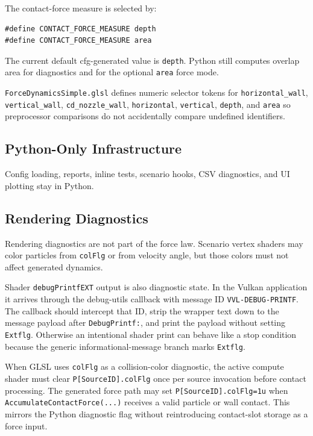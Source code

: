 The contact-force measure is selected by:
\begin{verbatim}
#define CONTACT_FORCE_MEASURE depth
#define CONTACT_FORCE_MEASURE area
\end{verbatim}
The current default cfg-generated value is \texttt{depth}.  Python still
computes overlap area for diagnostics and for the optional \texttt{area}
force mode.

\texttt{ForceDynamicsSimple.glsl} defines numeric selector tokens for
\texttt{horizontal\_wall}, \texttt{vertical\_wall},
\texttt{cd\_nozzle\_wall}, \texttt{horizontal}, \texttt{vertical},
\texttt{depth}, and \texttt{area} so preprocessor comparisons do not
accidentally compare undefined identifiers.

\subsection{Python-Only Infrastructure}

Config loading, reports, inline tests, scenario hooks, CSV diagnostics, and UI
plotting stay in Python.

\subsection{Rendering Diagnostics}

Rendering diagnostics are not part of the force law.  Scenario vertex shaders
may color particles from \texttt{colFlg} or from velocity angle, but those
colors must not affect generated dynamics.

Shader \texttt{debugPrintfEXT} output is also diagnostic state.  In the
Vulkan application it arrives through the debug-utils callback with message
ID \texttt{VVL-DEBUG-PRINTF}.  The callback should intercept that ID, strip
the wrapper text down to the message payload after \texttt{DebugPrintf:}, and
print the payload without setting \texttt{Extflg}.  Otherwise an intentional
shader print can behave like a stop condition because the generic
informational-message branch marks \texttt{Extflg}.

When GLSL uses \texttt{colFlg} as a collision-color diagnostic, the active
compute shader must clear \texttt{P[SourceID].colFlg} once per source
invocation before contact processing.  The generated force path may set
\texttt{P[SourceID].colFlg=1u} when \texttt{AccumulateContactForce(...)}
receives a valid particle or wall contact.  This mirrors the Python diagnostic
flag without reintroducing contact-slot storage as a force input.


